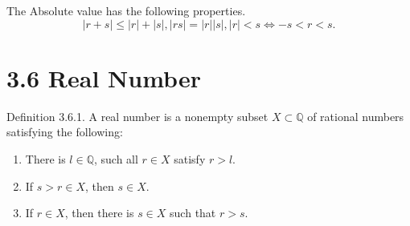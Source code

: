 \documentclass[12pt]{report}
\begin{document}
The Absolute value has the following properties.
$$|r+s|\leq|r|+|s|, |rs| = |r||s|, |r|<s \Longleftrightarrow -s < r < s .$$


\section*{3.6 Real Number}

Definition 3.6.1. A real number is a nonempty subset $X\subset \mathbb{Q}$ of rational numbers satisfying the following:
\begin{enumerate}
    \item There is $l \in \mathbb{Q}$, such all $r \in X$ satisfy $r>l$.
    \item If $s>r \in X$, then $s \in X$.
    \item If $r\in X$, then there is $s\in X$ such that $r>s$.
\end{enumerate}
\end{document}

